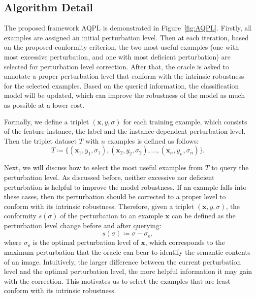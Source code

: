 \documentclass[letterpaper]{article} %
\begin{document}
\subsection{Algorithm Detail}

The proposed framework AQPL is demonstrated in Figure~\ref{fig:AQPL}. Firstly, all examples are assigned an initial perturbation level. Then at each iteration, based on the proposed conformity criterion, the two most useful examples (one with most excessive perturbation, and one with most deficient perturbation) are selected for perturbation level correction. After that, the oracle is asked to annotate a proper perturbation level that conform with the intrinsic robustness for the selected examples. Based on the queried information, the classification model will be updated, which can improve the robustness of the model as much as possible at a lower cost.

Formally, we define a triplet $(\mathbf{x}, y, \sigma)$ for each training example, which consists of the feature instance, the label and the instance-dependent perturbation level. Then the triplet dataset $T$ with $n$ examples is defined as follows:
\begin{equation}
T \coloneqq \{(\mathbf{x}_1,y_1,\sigma_1),(\mathbf{x}_2,y_2,\sigma_2),...,(\mathbf{x}_n,y_n,\sigma_n)\}.
\end{equation}

Next, we will discuss how to select the most useful examples from $T$ to query the perturbation level. As discussed before, neither excessive nor deficient perturbation is helpful to improve the model robustness. If an example falls into these cases, then its perturbation should be corrected to a proper level to conform with its intrinsic robustness. Therefore, given a triplet $(\mathbf{x},y,\sigma)$, the conformity $s(\sigma)$ of the perturbation to an example $\mathbf{x}$ can be defined as the perturbation level change before and after querying:
\begin{equation}\label{Eq:suitability}
s(\sigma) \coloneqq \sigma-\sigma_o,
\end{equation}
where $\sigma_o$ is the optimal perturbation level of $\mathbf{x}$, which corresponds to the maximum perturbation that the oracle can bear to identify the semantic contents of an image. Intuitively, the larger difference between the current perturbation level and the optimal perturbation level, the more helpful information it may gain with the correction. This motivates us to select the examples that are least conform with its intrinsic robustness.
\end{document}
